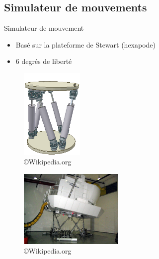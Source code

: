 \documentclass[compress, noflama]{beamer}
\begin{document}
\subsection{Simulateur de mouvements}
\begin{frame}{Simulateur de mouvement}
\begin{itemize}
\item Basé sur la plateforme de Stewart (hexapode)
\item 6 degrés de liberté
\end{itemize}
\begin{multicols}{2}
\begin{figure}
\centering
\includegraphics[width=3cm]{images/Hexapod}
\caption{\copyright Wikipedia.org}
\end{figure}
\begin{figure}
\centering
\includegraphics[width=5cm]{images/Simulator-flight}
\caption{\copyright Wikipedia.org}
\end{figure}
\end{multicols}
\end{frame}
\end{document}
